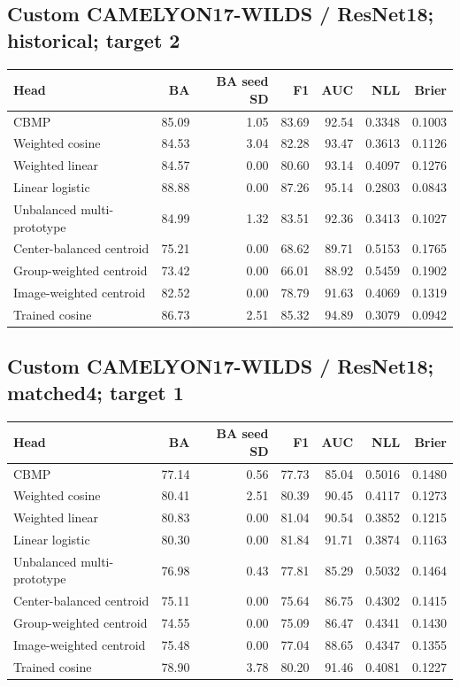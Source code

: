 \subsection*{Custom CAMELYON17-WILDS / ResNet18; historical; target 2}
\begingroup\small\setlength{\tabcolsep}{3pt}
\begin{longtable}{lrrrrrr}
\toprule Head & BA & BA seed SD & F1 & AUC & NLL & Brier \\
\midrule
CBMP & 85.09 & 1.05 & 83.69 & 92.54 & 0.3348 & 0.1003 \\
Weighted cosine & 84.53 & 3.04 & 82.28 & 93.47 & 0.3613 & 0.1126 \\
Weighted linear & 84.57 & 0.00 & 80.60 & 93.14 & 0.4097 & 0.1276 \\
Linear logistic & 88.88 & 0.00 & 87.26 & 95.14 & 0.2803 & 0.0843 \\
Unbalanced multi-prototype & 84.99 & 1.32 & 83.51 & 92.36 & 0.3413 & 0.1027 \\
Center-balanced centroid & 75.21 & 0.00 & 68.62 & 89.71 & 0.5153 & 0.1765 \\
Group-weighted centroid & 73.42 & 0.00 & 66.01 & 88.92 & 0.5459 & 0.1902 \\
Image-weighted centroid & 82.52 & 0.00 & 78.79 & 91.63 & 0.4069 & 0.1319 \\
Trained cosine & 86.73 & 2.51 & 85.32 & 94.89 & 0.3079 & 0.0942 \\
\bottomrule
\end{longtable}
\endgroup
\subsection*{Custom CAMELYON17-WILDS / ResNet18; matched4; target 1}
\begingroup\small\setlength{\tabcolsep}{3pt}
\begin{longtable}{lrrrrrr}
\toprule Head & BA & BA seed SD & F1 & AUC & NLL & Brier \\
\midrule
CBMP & 77.14 & 0.56 & 77.73 & 85.04 & 0.5016 & 0.1480 \\
Weighted cosine & 80.41 & 2.51 & 80.39 & 90.45 & 0.4117 & 0.1273 \\
Weighted linear & 80.83 & 0.00 & 81.04 & 90.54 & 0.3852 & 0.1215 \\
Linear logistic & 80.30 & 0.00 & 81.84 & 91.71 & 0.3874 & 0.1163 \\
Unbalanced multi-prototype & 76.98 & 0.43 & 77.81 & 85.29 & 0.5032 & 0.1464 \\
Center-balanced centroid & 75.11 & 0.00 & 75.64 & 86.75 & 0.4302 & 0.1415 \\
Group-weighted centroid & 74.55 & 0.00 & 75.09 & 86.47 & 0.4341 & 0.1430 \\
Image-weighted centroid & 75.48 & 0.00 & 77.04 & 88.65 & 0.4347 & 0.1355 \\
Trained cosine & 78.90 & 3.78 & 80.20 & 91.46 & 0.4081 & 0.1227 \\
\bottomrule
\end{longtable}
\endgroup
